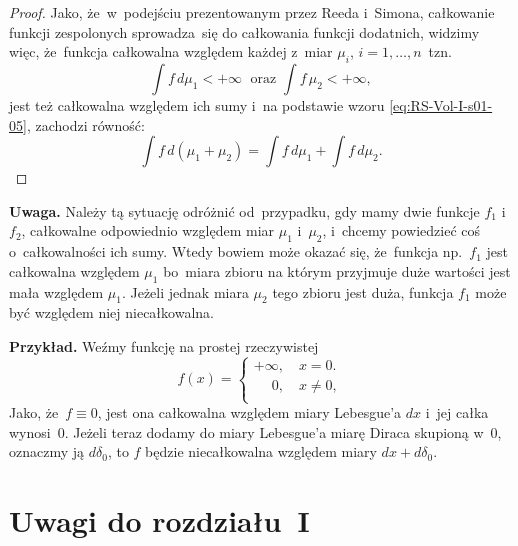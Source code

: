 \documentclass[a4paper,11pt]{article}
\numberwithin{equation}{section}
\begin{document}
\begin{proof}
  Jako, że~w~podejściu prezentowanym przez Reeda i~Simona, całkowanie
  funkcji zespolonych sprowadza~się do całkowania funkcji dodatnich,
  widzimy więc, że~funkcja całkowalna względem każdej z~miar
  $\mu_{ i }$, $i = 1, \ldots, n$~tzn.
  \begin{equation}
    \label{eq:RS-Vol-I-s01-05}
    \int f \, d\mu_{ 1 } < +\infty \; \textrm{  oraz  }
    \int f \, \mu_{ 2 } < +\infty,
  \end{equation}
  jest też całkowalna względem ich sumy i~na podstawie wzoru
  \eqref{eq:RS-Vol-I-s01-05}, zachodzi równość:
  \begin{equation}
    \label{eq:RS-Vol-I-s01-06}
    \int f \, d( \mu_{ 1 } + \mu_{ 2 } )
    = \int f \, d\mu_{ 1 }  + \int f \, d\mu_{ 2 }.
  \end{equation}

\end{proof}





\textbf{Uwaga.} Należy tą sytuację odróżnić od~przypadku, gdy mamy dwie
funkcje $f_{ 1 }$ i~$f_{ 2 }$, całkowalne odpowiednio względem miar
$\mu_{ 1 }$ i~$\mu_{ 2 }$, i~chcemy powiedzieć coś o~całkowalności ich
sumy. Wtedy bowiem może okazać się, że~funkcja np.~$f_{ 1 }$ jest
całkowalna względem $\mu_{ 1 }$ bo~miara zbioru na którym przyjmuje
duże wartości jest mała względem $\mu_{ 1 }$. Jeżeli jednak miara
$\mu_{ 2 }$ tego zbioru jest duża, funkcja $f_{ 1 }$ może być względem
niej niecałkowalna.

\textbf{Przykład.} Weźmy funkcję na prostej rzeczywistej
\begin{equation}
  \label{eq:RS-Vol-I-s01-07}
  f( x ) =
  \begin{cases}
    +\infty, \quad x = 0. \\
    \quad \;0, \quad x \neq 0, \\
  \end{cases}
\end{equation}
Jako, że~$f \equiv 0$, jest ona całkowalna względem miary Lebesgue'a
$dx$ i~jej całka wynosi~0. Jeżeli teraz dodamy do miary Lebesgue'a
miarę Diraca skupioną w~0, oznaczmy ją $d\delta_{ 0 }$, to $f$ będzie
niecałkowalna względem miary $dx + d\delta_{ 0 }$. %










\section{Uwagi do rozdziału~I}
\end{document}
